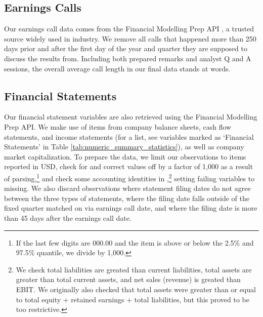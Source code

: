 \documentclass{article}[11pt]
\begin{document}
    \subsection*{Earnings Calls}

    Our earnings call data comes from the Financial Modelling Prep API \citep{financial_modeling_prep_financial_2024}, a trusted source widely used in industry. We remove all calls that happened more than 250 days prior and after the first day of the year and quarter they are supposed to discuss the results from. Including both prepared remarks and analyst Q and A sessions, the overall average call length in our final data stands at \avgCallLength \space words.

    \subsection*{Financial Statements}

    Our financial statement variables are also retrieved using the Financial Modelling Prep API. We make use of items from company balance sheets, cash flow statements, and income statements (for a list, see variables marked as `Financial Statements' in Table \ref{tab:numeric_summary_statistics}), as well as company market capitalization. To prepare the data, we limit our observations to items reported in USD, check for and correct values off by a factor of 1,000 as a result of parsing,\footnote{If the last few digits are 000.00 and the item is above or below the 2.5\% and 97.5\% quantile, we divide by 1,000.} and check some accounting identities in \cite{das_credit_2023},\footnote{We check total liabilities are greated than current liabilities, total assets are greater than total current assets, and net sales (revenue) is greated than EBIT. We originally also checked that total assets were greater than or equal to total equity + retained earnings + total liabilities, but this proved to be too restrictive.} setting failing variables to missing. We also discard observations where statement filing dates do not agree between the three types of statements, where the filing date falls outside of the fixed quarter matched on via earnings call date, and where the filing date is more than 45 days after the earnings call date.
\end{document}
